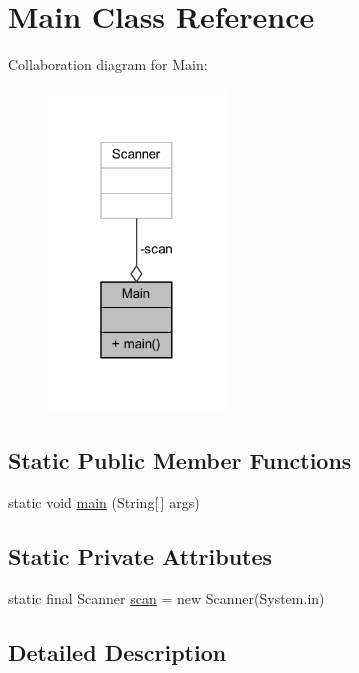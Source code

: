 \hypertarget{classmain_1_1_main}{}\section{Main Class Reference}
\label{classmain_1_1_main}


Collaboration diagram for Main\+:
\nopagebreak
\begin{figure}[H]
\begin{center}
\leavevmode
\includegraphics[width=135pt]{classmain_1_1_main__coll__graph}
\end{center}
\end{figure}
\subsection*{Static Public Member Functions}
\begin{DoxyCompactItemize}
\item 
static void \mbox{\hyperlink{classmain_1_1_main_a8b260eecbaabcef8473fd87ada040682}{main}} (String\mbox{[}$\,$\mbox{]} args)
\end{DoxyCompactItemize}
\subsection*{Static Private Attributes}
\begin{DoxyCompactItemize}
\item 
static final Scanner \mbox{\hyperlink{classmain_1_1_main_ad2b26d92ead66c3a1c4e4d4d77394aba}{scan}} = new Scanner(System.\+in)
\end{DoxyCompactItemize}


\subsection{Detailed Description}


